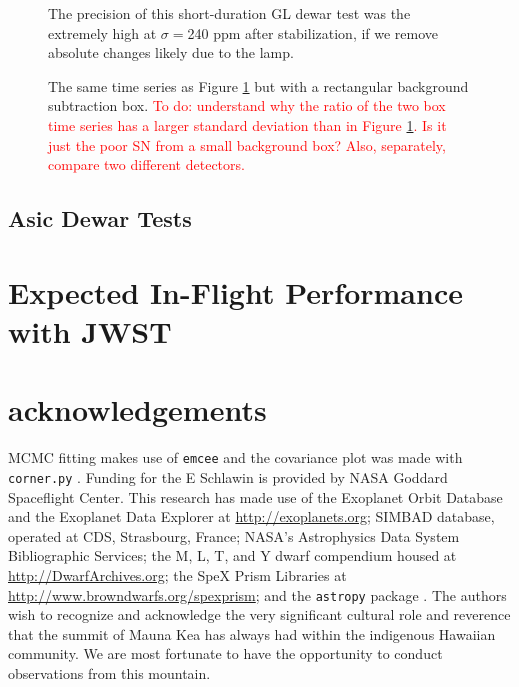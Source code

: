 \documentclass{aastex62}
\begin{document}
{\begin{figure}
\caption{The precision of this short-duration GL dewar test was the extremely high at $\sigma=$240 ppm after stabilization, if we remove absolute changes likely due to the lamp.
}\label{fig:GLtSeries}
\end{figure}

\begin{figure}
\caption{The same time series as Figure \ref{fig:GLtSeries} but with a rectangular background subtraction box.
\textcolor{red}{To do: understand why the ratio of the two box time series has a larger standard deviation than in Figure \ref{fig:GLtSeries}. Is it just the poor SN from a small background box? Also, separately, compare two different detectors.}
}\label{fig:GLtSeriesBacksub}
\end{figure}

\subsection{Asic Dewar Tests}

\acknowledgments

\section{Expected In-Flight Performance with JWST}

\section*{acknowledgements}
MCMC fitting makes use of \texttt{emcee} \citep{foreman-mackey2013emcee} and the covariance plot was made with \texttt{corner.py} \citep{foremanCorner}.
Funding for the E Schlawin is provided by NASA Goddard Spaceflight Center.
This research has made
use of the Exoplanet Orbit Database and the Exoplanet Data Explorer at \url{http://exoplanets.org}; SIMBAD database, operated at CDS, Strasbourg,
France; NASA's Astrophysics Data System Bibliographic
Services; the M, L, T, and Y dwarf compendium
housed at \url{http://DwarfArchives.org}; the SpeX Prism
Libraries at \url{http://www.browndwarfs.org/spexprism}; and the \texttt{astropy} package \citep{astropy2013}. 
The authors wish to recognize and acknowledge the very significant cultural role and reverence that the summit of Mauna Kea has always had within the indigenous Hawaiian community. We are most fortunate to have the opportunity to conduct observations from this mountain.

}
\end{document}
